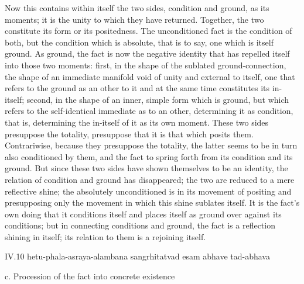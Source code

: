 Now this contains within itself the two sides,
condition and ground, as its moments;
it is the unity to which they have returned.
Together, the two constitute its form or its positedness.
The unconditioned fact is the condition of both,
but the condition which is absolute, that is to say,
one which is itself ground.
As ground, the fact is now the negative identity
that has repelled itself into those two moments:
first, in the shape of the sublated ground-connection,
the shape of an immediate manifold void of
unity and external to itself,
one that refers to the ground as an other to it
and at the same time constitutes its in-itself;
second, in the shape of an inner, simple form which is ground,
but which refers to the self-identical
immediate as to an other, determining it as condition,
that is, determining the in-itself of it as its own moment.
These two sides presuppose the totality,
presuppose that it is that which posits them.
Contrariwise, because they presuppose the totality,
the latter seems to be in turn also conditioned by them,
and the fact to spring forth from its condition and its ground.
But since these two sides have shown themselves to be an identity,
the relation of condition and ground has disappeared;
the two are reduced to a mere reflective shine;
the absolutely unconditioned is in its movement of positing
and presupposing only the movement in which this shine sublates itself.
It is the fact's own doing that it conditions itself
and places itself as ground over against its conditions;
but in connecting conditions and ground,
the fact is a reflection shining in itself;
its relation to them is a rejoining itself.

IV.10
hetu-phala-asraya-alambana sangrhitatvad esam abhave tad-abhava

c. Procession of the fact into concrete existence

